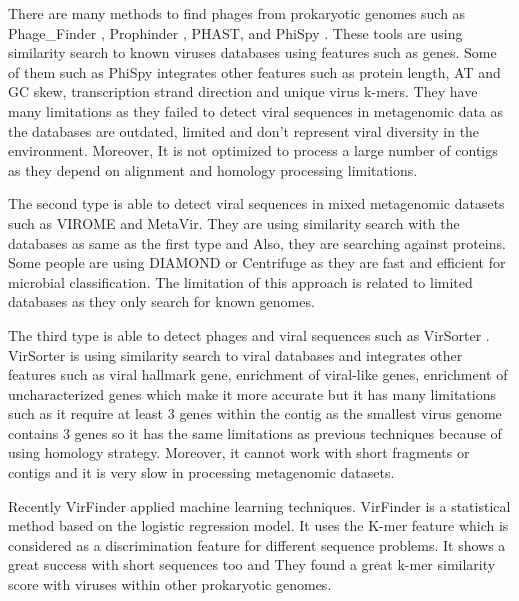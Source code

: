 \documentclass[conference]{IEEEtran}
\begin{document}
There are many methods to find phages from prokaryotic genomes such as Phage\_Finder \cite{fouts2006phage_finder}, Prophinder \cite{lima2008prophinder}, PHAST\cite{zhou2011phast}, and PhiSpy \cite{akhter2012phispy}. These tools are using similarity search to known viruses databases using features such as genes. Some of them such as PhiSpy integrates other features such as protein length, AT and GC skew, transcription strand direction and unique virus k-mers. They have many limitations as they failed to detect viral sequences in metagenomic data as the databases are outdated, limited and don't represent viral diversity in the environment. Moreover, It is not optimized to process a large number of contigs \cite{roux2015virsorter} as they depend on alignment and homology processing limitations. 

The second type is able to detect viral sequences in mixed metagenomic datasets such as VIROME \cite{wommack2012virome} and MetaVir\cite{roux2011metavir}. They are using similarity search with the databases as same as the first type and Also, they are searching against proteins. Some people are using DIAMOND \cite{buchfink2014Diamond} or Centrifuge \cite{kim2016centrifuge} as they are fast and efficient for microbial classification. The limitation of this approach is related to limited databases as they only search for known genomes. 

The third type is able to detect phages and viral sequences such as VirSorter \cite{roux2015virsorter}. VirSorter is using similarity search to viral databases and integrates other features such as viral hallmark gene, enrichment of viral-like genes, enrichment of uncharacterized genes which make it more accurate but it has many limitations such as it require at least 3 genes within the contig as the smallest virus genome contains 3 genes so it has the same limitations as previous techniques because of using homology strategy. Moreover, it cannot work with short fragments or contigs and it is very slow in processing metagenomic datasets. 

Recently VirFinder \cite{ren2017virfinder} applied machine learning techniques. VirFinder is a statistical method based on the logistic regression model. It uses the K-mer feature which is considered as a discrimination feature for different sequence problems. It shows a great success with short sequences too and They found a great k-mer similarity score with viruses within other prokaryotic genomes. 

\end{document}
